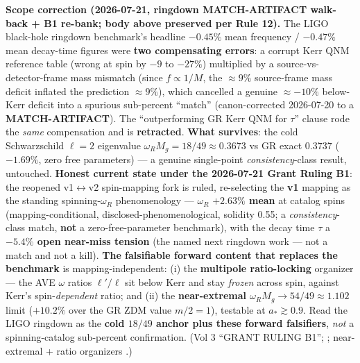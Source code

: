 \noindent \textbf{Scope correction (2026-07-21, ringdown MATCH-ARTIFACT walk-back + B1 re-bank; body above preserved per Rule 12).} The LIGO black-hole ringdown benchmark's headline $-0.45\%$ mean frequency / $-0.47\%$ mean decay-time figures were \textbf{two compensating errors}: a corrupt Kerr QNM reference table (wrong at spin by $-9$ to $-27\%$) multiplied by a source-vs-detector-frame mass mismatch (since $f \propto 1/M$, the $\approx 9\%$ source-frame mass deficit inflated the prediction $\approx 9\%$), which cancelled a genuine $\approx -10\%$ below-Kerr deficit into a spurious sub-percent ``match'' (canon-corrected 2026-07-20 to a \textbf{MATCH-ARTIFACT}). The ``outperforming GR Kerr QNM for $\tau$'' clause rode the \emph{same} compensation and is \textbf{retracted}. \textbf{What survives}: the cold Schwarzschild $\ell=2$ eigenvalue $\omega_R M_g = 18/49 \approx 0.3673$ vs GR exact $0.3737$ ($\mathbf{-1.69\%}$, zero free parameters) --- a genuine single-point \emph{consistency}-class result, untouched. \textbf{Honest current state under the 2026-07-21 Grant Ruling B1}: the reopened v1$\leftrightarrow$v2 spin-mapping fork is ruled, re-selecting the \textbf{v1} mapping as the standing spinning-$\omega_R$ phenomenology --- $\omega_R$ \textbf{$+2.63\%$ mean} at catalog spins (mapping-conditional, disclosed-phenomenological, solidity 0.55; a \emph{consistency}-class match, \textbf{not} a zero-free-parameter benchmark), with the decay time $\tau$ a \textbf{$-5.4\%$ open near-miss tension} (the named next ringdown work --- not a match and not a kill). \textbf{The falsifiable forward content that replaces the benchmark} is mapping-independent: (i) the \textbf{multipole ratio-locking} organizer --- the AVE $\omega$ ratios $\ell'/\ell$ sit below Kerr and stay \emph{frozen} across spin, against Kerr's spin-\emph{dependent} ratio; and (ii) the \textbf{near-extremal $\omega_R M_g \to 54/49 \approx 1.102$} limit ($+10.2\%$ over the GR ZDM value $m/2 = 1$), testable at $a_* \gtrsim 0.9$. Read the LIGO ringdown as the \textbf{cold $18/49$ anchor plus these forward falsifiers}, \emph{not} a spinning-catalog sub-percent confirmation. (Vol 3  ``GRANT RULING B1''; ; near-extremal + ratio organizers .)

